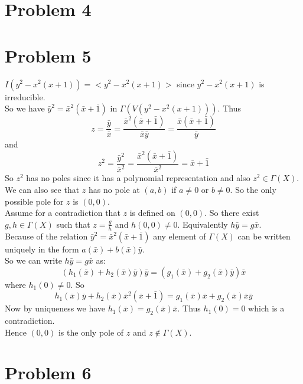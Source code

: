 \documentclass[12pt]{article}
\begin{document}
\section*{Problem 4}



\clearpage
\section*{Problem 5}
$I(y^2-x^2(x+1))=<y^2-x^2(x+1)>$ since $y^2-x^2(x+1)$ is irreducible.\\ 
So we have
$\bar{y}^2=\bar{x}^2(\bar{x}+\bar{1})$ in $\Gamma (V(y^2-x^2(x+1)))$. Thus\\
$$z=\frac{\bar{y}}{\bar{x}}=
\frac{\bar{x}^2(\bar{x}+\bar{1})}{\bar{x}\bar{y}}
=\frac{\bar{x}(\bar{x}+\bar{1})}{\bar{y}}$$
and
$$z^2=\frac{\bar{y}^2}{\bar{x}^2}
= \frac{\bar{x}^2(\bar{x}+\bar{1})}{\bar{x}^2}
=\bar{x}+\bar{1}$$
So $z^2$ has no poles since it has a polynomial representation and also $z^2 \in \Gamma(X)$.\\
We can also see that $z$ has no pole at $(a,b)$ if $a \not=0$ or $b \not=0$. So the only possible pole for $z$ is $(0,0)$. \\
Assume for a contradiction that $z$ is defined on $(0,0)$. So there exist $g,h \in \Gamma(X)$ such that $z=\frac{g}{h}$ and $h(0,0) \not=0$. Equivalently $h\bar{y}=g\bar{x}$. \\
Because of the relation $\bar{y}^2=\bar{x}^2(\bar{x}+\bar{1})$ any element
of $\Gamma(X)$ can be written uniquely in the form
$a(\bar{x})+b(\bar{x})\bar{y}$.\\
So we can write $h\bar{y}=g\bar{x}$ as:
$$(h_1(\bar{x})+h_2(\bar{x})\bar{y})\bar{y}=
(g_1(\bar{x})+g_2(\bar{x})\bar{y})\bar{x}$$
where $h_1(0) \not=0$. So
$$
h_1(\bar{x})\bar{y}+h_2(\bar{x})\bar{x}^2(\bar{x}+\bar{1})=
g_1(\bar{x})\bar{x}+g_2(\bar{x})\bar{x}\bar{y}
$$
Now by uniqueness we have $h_1(\bar{x})=g_2(\bar{x})\bar{x}$. Thus $h_1(0)=0$ which is a contradiction. \\
Hence $(0,0)$ is the only pole of $z$ and $z \not\in \Gamma(X)$.

\clearpage
\section*{Problem 6}
\end{document}
